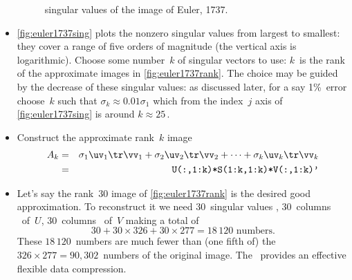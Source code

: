 \begin{example}
\begin{solution}
\begin{itemize}
\begin{figure}
\caption{singular values of the image of Euler, 1737.}
\label{fig:euler1737sing}
\centering

\end{figure}
\item \autoref{fig:euler1737sing} plots the nonzero singular values from largest to smallest: they cover a range of five orders of magnitude (the vertical axis is logarithmic).
Choose some number~\(k\) of singular vectors to use: \(k\)~is the rank of the approximate images in \autoref{fig:euler1737rank}.
The choice may be guided by the decrease of these singular values: as discussed later, for a say 1\%~error choose~\(k\) such that \(\sigma_k\approx 0.01\sigma_1\) which from the index~\(j\) axis of \autoref{fig:euler1737sing} is around \(k\approx 25\)\,.

\item Construct the approximate rank~\(k\) image
\begin{eqnarray*}
A_k&=&\sigma_1\uv_1\tr\vv_1+\sigma_2\uv_2\tr\vv_2+\cdots+\sigma_k\uv_k\tr\vv_k
\\&=&\verb|U(:,1:k)*S(1:k,1:k)*V(:,1:k)'|
\end{eqnarray*}

\item Let's say the rank~\(30\) image of \autoref{fig:euler1737rank} is the desired good approximation.  
To reconstruct it we need \(30\)~singular values \hlist{}, \(30\)~columns \hlist{}\ of~\(U\), \(30\)~columns \hlist{}\ of~\(V\) making a total of
\begin{equation*}
30+30\times326+30\times277=18\,120\text{ numbers}.
\end{equation*}
These \(18\,120\)~numbers are much fewer than (one fifth of) the \(326\times277=90,302\)~numbers of the original image.
The \svd\ provides an effective flexible data compression.
\end{itemize}
\end{solution}
\end{example}








